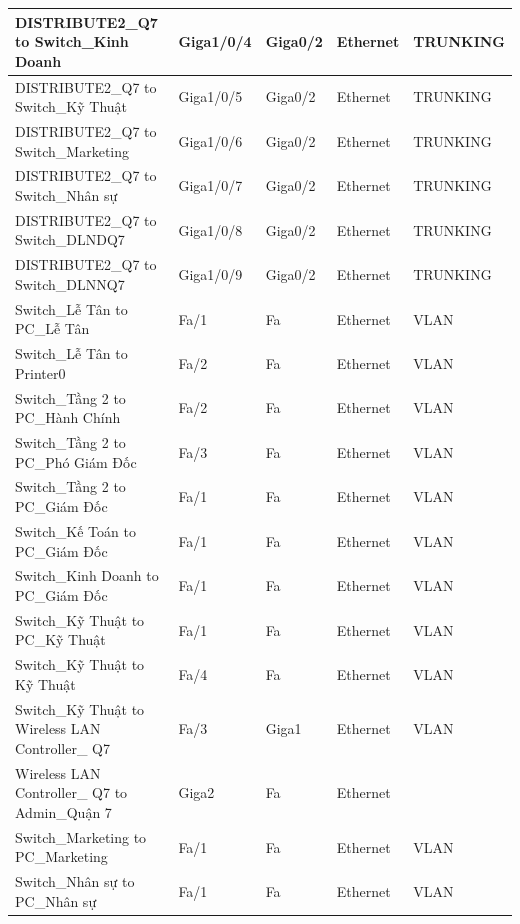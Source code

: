 \documentclass[a4paper, 12pt]{article}
\begin{document}
\begin{center}
\begin{longtable}{|p{}|p{}|p{}|p{}|p{}|}
\hline DISTRIBUTE2\_Q7 to Switch\_Kinh Doanh     &     Giga1/0/4     &     Giga0/2    &  Ethernet  &  TRUNKING  \\
\hline DISTRIBUTE2\_Q7 to Switch\_Kỹ Thuật    &     Giga1/0/5     &     Giga0/2    &  Ethernet  &  TRUNKING  \\
\hline DISTRIBUTE2\_Q7 to Switch\_Marketing    &     Giga1/0/6     &     Giga0/2    &  Ethernet  &  TRUNKING  \\
\hline DISTRIBUTE2\_Q7 to Switch\_Nhân sự    &     Giga1/0/7     &     Giga0/2    &  Ethernet  &  TRUNKING  \\
\hline DISTRIBUTE2\_Q7 to Switch\_DLNDQ7     &     Giga1/0/8     &     Giga0/2    &  Ethernet  &  TRUNKING  \\
\hline DISTRIBUTE2\_Q7 to Switch\_DLNNQ7     &     Giga1/0/9     &     Giga0/2    &  Ethernet  &  TRUNKING  \\
\hline Switch\_Lễ Tân to PC\_Lễ Tân    &     Fa/1     &     Fa    &  Ethernet  &  VLAN  \\
\hline Switch\_Lễ Tân to Printer0    &     Fa/2     &     Fa    &  Ethernet  &  VLAN  \\
\hline Switch\_Tầng 2 to PC\_Hành Chính     &     Fa/2     &     Fa    &  Ethernet  &  VLAN  \\
\hline Switch\_Tầng 2 to PC\_Phó Giám Đốc     &     Fa/3     &     Fa    &  Ethernet  &  VLAN  \\
\hline Switch\_Tầng 2 to PC\_Giám Đốc     &     Fa/1     &     Fa    &  Ethernet  &  VLAN  \\
\hline Switch\_Kế Toán to PC\_Giám Đốc     &     Fa/1     &     Fa    &  Ethernet  &  VLAN  \\
\hline Switch\_Kinh Doanh to PC\_Giám Đốc     &     Fa/1     &     Fa    &  Ethernet  &  VLAN  \\
\hline Switch\_Kỹ Thuật to PC\_Kỹ Thuật     &     Fa/1     &     Fa    &  Ethernet  &  VLAN  \\
\hline Switch\_Kỹ Thuật to Kỹ Thuật     &     Fa/4     &     Fa    &  Ethernet  &  VLAN  \\
\hline Switch\_Kỹ Thuật to Wireless LAN Controller\_ Q7     &     Fa/3     &     Giga1    &  Ethernet  &  VLAN  \\
\hline Wireless LAN Controller\_ Q7 to Admin\_Quận 7      &     Giga2     &     Fa    &  Ethernet  &   \\
\hline Switch\_Marketing to PC\_Marketing     &     Fa/1     &     Fa    &  Ethernet  &  VLAN  \\
\hline Switch\_Nhân sự to PC\_Nhân sự    &     Fa/1     &     Fa    &  Ethernet  &  VLAN  \\

\end{longtable}
\end{center}
\end{document}
